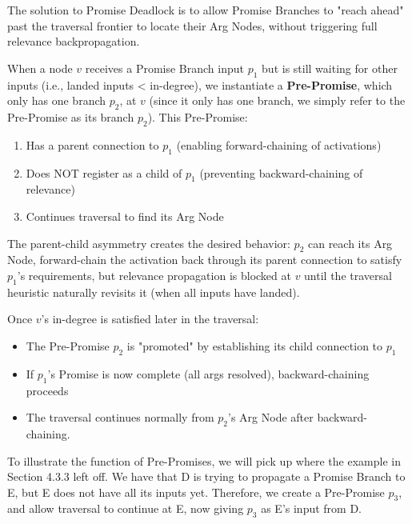 \documentclass{article}
\begin{document}
The solution to Promise Deadlock is to allow Promise Branches to "reach ahead" past the traversal frontier to locate their Arg Nodes, without triggering full relevance backpropagation.

When a node $v$ receives a Promise Branch input $p_1$ but is still waiting for other inputs (i.e., landed inputs < in-degree), we instantiate a \textbf{Pre-Promise}, which only has one branch $p_2$, at $v$
(since it only has one branch, we simply refer to the Pre-Promise as its branch $p_2$). This Pre-Promise:

\begin{enumerate}
    \item Has a parent connection to $p_1$ (enabling forward-chaining of activations)
    \item Does NOT register as a child of $p_1$ (preventing backward-chaining of relevance)
    \item Continues traversal to find its Arg Node
\end{enumerate}

The parent-child asymmetry creates the desired behavior: $p_2$ can reach its Arg Node, forward-chain the activation back through its parent connection to satisfy $p_1$'s requirements, but relevance propagation is blocked at $v$ until the traversal heuristic naturally revisits it (when all inputs have landed).

Once $v$'s in-degree is satisfied later in the traversal:
\begin{itemize}
    \item The Pre-Promise $p_2$ is "promoted" by establishing its child connection to $p_1$
    \item If $p_1$'s Promise is now complete (all args resolved), backward-chaining proceeds
    \item The traversal continues normally from $p_2$'s Arg Node after backward-chaining.
\end{itemize}

To illustrate the function of Pre-Promises, we will pick up where the example in Section 4.3.3 left off. We have that D is trying to propagate a Promise Branch to E, but E does not
have all its inputs yet. Therefore, we create a Pre-Promise $p_3$, and allow traversal to continue at E, now giving $p_3$ as E's input from D.

\begin{center}
\end{center}
\end{document}
